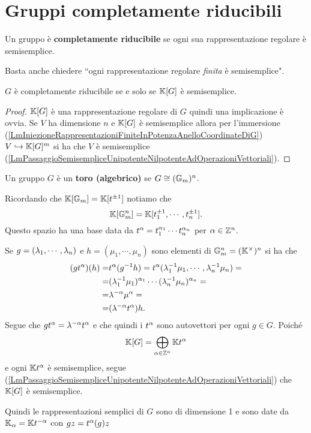\section{Gruppi completamente riducibili}
\begin{definition}
Un gruppo \`e \textbf{completamente riducibile} se ogni sua rappresentazione regolare \`e semisemplice.
\end{definition}
\begin{remark}
Basta anche chiedere ``ogni rappresentazione regolare \emph{finita} \`e semisemplice".
\end{remark}

\begin{remark}
$G$ \`e completamente riducibile se e solo se $\mathbb{K}[G]$ \`e semisemplice.
\end{remark}
\begin{proof}
$\mathbb{K}[G]$ \`e una rappresentazione regolare di $G$ quindi una implicazione \`e ovvia.
Se $V$ ha dimensione $n$ e $\mathbb{K}[G]$ \`e semisemplice allora per l'immersione (\ref{LmIniezioneRappresentazioniFiniteInPotenzaAnelloCoordinateDiG}) $V\hookrightarrow \mathbb{K}[G]^m$ si ha che $V$ \`e semisemplice (\ref{LmPassaggioSemisempliceUnipotenteNilpotenteAdOperazioniVettoriali}).
\end{proof}

\begin{definition}
Un gruppo $G$ \`e un \textbf{toro (algebrico)} se $G\cong (\mathbb{G}_m)^n$.
\end{definition}

\begin{remark}
Ricordando che $\mathbb{K}[\mathbb{G}_m]=\mathbb{K}[t^{\pm1}]$ notiamo che
\[\mathbb{K}[\mathbb{G}_m^n]=\mathbb{K}[t_1^{\pm1},\cdots,t_n^{\pm1}].\]
Questo spazio ha una base data da $t^\alpha=t_1^{\alpha_1}\cdots t_n^{\alpha_n}$ per $\alpha\in \mathbb{Z}^n$.
\end{remark}

\begin{remark}
Se $g=(\lambda_1,\cdots, \lambda_n)$ e $h=(\mu_1,\cdots, \mu_n)$ sono elementi di $\mathbb{G}_m^n=(\mathbb{K}^\times)^n$ si ha che
\begin{align*}
(gt^\alpha)(h)=&t^\alpha(g^{-1} h)=t^\alpha(\lambda_1^{-1} \mu_1,\cdots, \lambda_n^{-1}\mu_n)=\\
=&(\lambda_1^{-1}\mu_1)^{\alpha_1}\cdots (\lambda_n^{-1}\mu_n)^{\alpha_n}=\\
=&\lambda^{-\alpha}\mu^\alpha=\\
=&(\lambda^{-\alpha}t^\alpha)h.
\end{align*}
Segue che $gt^\alpha=\lambda^{-\alpha}t^\alpha$ e che quindi i $t^\alpha$ sono autovettori per ogni $g\in G$. Poich\'e
\[\mathbb{K}[G]=\bigoplus_{\alpha\in\mathbb{Z}^n} \mathbb{K} t^\alpha\]
e ogni $\mathbb{K} t^\alpha$ \`e semisemplice, segue (\ref{LmPassaggioSemisempliceUnipotenteNilpotenteAdOperazioniVettoriali}) che $\mathbb{K}[G]$ \`e semisemplice.

Quindi le rappresentazioni semplici di $G$ sono di dimensione 1 e sono date da $\mathbb{K}_\alpha=\mathbb{K} t^{-\alpha}$ con $gz=t^\alpha(g)z$
\end{remark}


